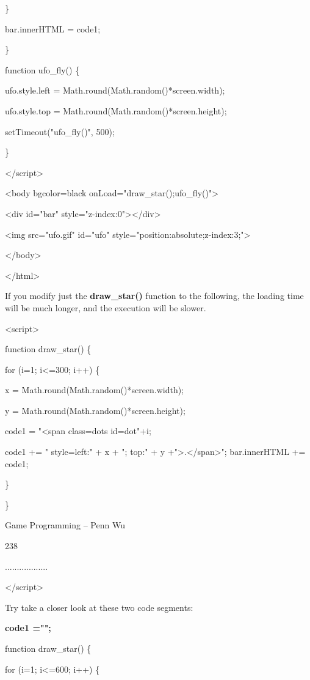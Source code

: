 \documentclass[
]{article}
\begin{document}
\}

bar.innerHTML = code1;

\}

function ufo\_fly() \{

ufo.style.left = Math.round(Math.random()*screen.width);

ufo.style.top = Math.round(Math.random()*screen.height);

setTimeout("ufo\_fly()", 500);

\}

\textless/script\textgreater{}

\textless body bgcolor=black
onLoad="draw\_star();ufo\_fly()"\textgreater{}

\textless div id="bar"
style="z-index:0"\textgreater\textless/div\textgreater{}

\textless img src="ufo.gif" id="ufo"
style="position:absolute;z-index:3;"\textgreater{}

\textless/body\textgreater{}

\textless/html\textgreater{}

If you modify just the \textbf{draw\_star()} function to the following,
the loading time will be much longer, and the execution will be slower.

\textless script\textgreater{}

function draw\_star() \{

for (i=1; i\textless=300; i++) \{

x = Math.round(Math.random()*screen.width);

y = Math.round(Math.random()*screen.height);

code1 = "\textless span class=dots id=dot"+i;

code1 += " style=\textquotesingle left:" + x + "; top:" + y
+"\textquotesingle\textgreater.\textless/span\textgreater";
bar.innerHTML += code1;

\}

\}

Game Programming -- Penn Wu

238

\protect\hypertarget{index_split_012.htmlux5cux23p239}{}{}..................

\textless/script\textgreater{}

Try take a closer look at these two code segments:

\textbf{code1 ="";}

function draw\_star() \{

for (i=1; i\textless=600; i++) \{
\end{document}
